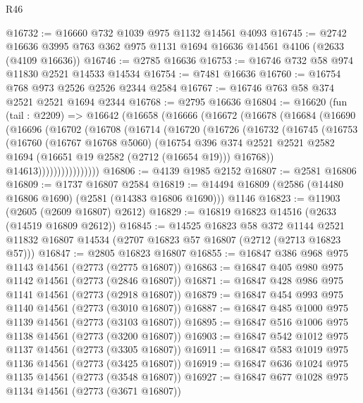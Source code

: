 \begin{lexlean}{R46}
\begin{coremodule}
@16732 := @16660 @732 @1039 @975 @1132 @14561 @4093
@16745 := @2742 @16636 @3995 @763 @362 @975 @1131 @1694 @16636 @14561 @4106 (@2633 (@4109 @16636))
@16746 := @2785 @16636
@16753 := @16746 @732 @58 @974 @11830 @2521 @14533 @14534
@16754 := @7481 @16636
@16760 := @16754 @768 @973 @2526 @2526 @2344 @2584
@16767 := @16746 @763 @58 @374 @2521 @2521 @1694 @2344
@16768 := @2795 @16636
@16804 := @16620
    (fun (tail : @2209) =>
    @16642
      (@16658
        (@16666
          (@16672
            (@16678
              (@16684
                (@16690
                  (@16696
                    (@16702
                      (@16708
                        (@16714
                          (@16720
                            (@16726
                              (@16732
                                (@16745
                                  (@16753
                                    (@16760
                                      (@16767 @16768 @5060)
                                      (@16754
                                        @396
                                        @374
                                        @2521
                                        @2521
                                        @2582
                                        @1694
                                        (@16651 @19 @2582 (@2712 (@16654 @19)))
                                        @16768))
                                    @14613))))))))))))))))
@16806 := @4139 @1985 @2152
@16807 := @2581 @16806
@16809 := @1737 @16807 @2584
@16819 := @14494 @16809 (@2586 (@14480 @16806 @1690) (@2581 (@14383 @16806 @1690))) @1146
@16823 := @11903 (@2605 (@2609 @16807) @2612)
@16829 := @16819 @16823 @14516 (@2633 (@14519 @16809 @2612))
@16845 := @14525
    @16823
    @58
    @372
    @1144
    @2521
    @11832
    @16807
    @14534
    (@2707 @16823 @57 @16807 (@2712 (@2713 @16823 @57)))
@16847 := @2805 @16823 @16807
@16855 := @16847 @386 @968 @975 @1143 @14561 (@2773 (@2775 @16807))
@16863 := @16847 @405 @980 @975 @1142 @14561 (@2773 (@2846 @16807))
@16871 := @16847 @428 @986 @975 @1141 @14561 (@2773 (@2918 @16807))
@16879 := @16847 @454 @993 @975 @1140 @14561 (@2773 (@3010 @16807))
@16887 := @16847 @485 @1000 @975 @1139 @14561 (@2773 (@3103 @16807))
@16895 := @16847 @516 @1006 @975 @1138 @14561 (@2773 (@3200 @16807))
@16903 := @16847 @542 @1012 @975 @1137 @14561 (@2773 (@3305 @16807))
@16911 := @16847 @583 @1019 @975 @1136 @14561 (@2773 (@3425 @16807))
@16919 := @16847 @636 @1024 @975 @1135 @14561 (@2773 (@3548 @16807))
@16927 := @16847 @677 @1028 @975 @1134 @14561 (@2773 (@3671 @16807))

\end{coremodule}
\end{lexlean}
